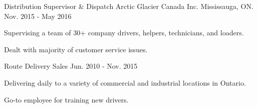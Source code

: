 \begin{cventries}
  \cventry
    {Distribution Supervisor \& Dispatch} %
    {Arctic Glacier Canada Inc.} %
    {Mississauga, ON.} %
    {Nov. 2015 - May 2016} %
    {
      \begin{cvitems} 
        \item {Supervising a team of 30+ company drivers, helpers, technicians, and loaders.}
        \item {Dealt with majority of customer service issues.}
      \end{cvitems}
 	  }


  \cventry
    {Route Delivery Sales}
    {} %
    {} %
    {Jun. 2010 - Nov. 2015} %
    {
      \begin{cvitems}
        \item {Delivering daily to a variety of commercial and industrial locations in Ontario.}
        \item {Go-to employee for training new drivers.}
      \end{cvitems}
     }
     
\end{cventries}